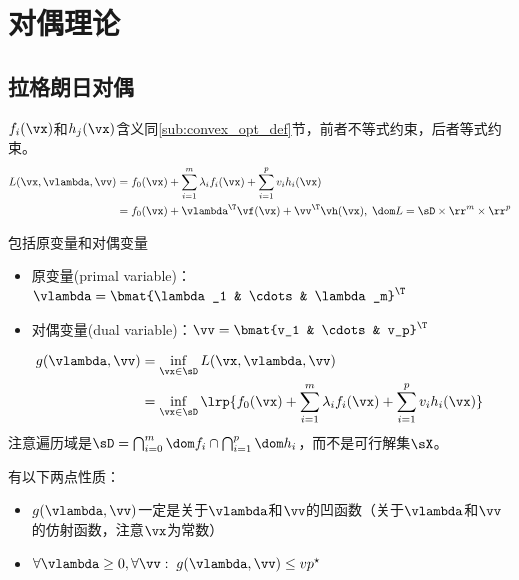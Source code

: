 
\section{对偶理论}
\subsection{拉格朗日对偶}
\begin{definition}
$f_i(\vx)$和$h_j(\vx)$含义同\ref{sub:convex_opt_def}节，前者不等式约束，后者等式约束。
\[\begin{aligned}
    L(\vx,\vlambda,\vv)&=f_0(\vx)+\sum_{i=1}^m\lambda_if_i(\vx)+\sum_{i=1}^pv_ih_i(\vx)\\
    &=f_0(\vx) + \vlambda^\T \vf(\vx)+\vv^\T \vh(\vx),\;\dom L=\sD\times \rr^m\times \rr^p
\end{aligned}\]
\end{definition}

\begin{definition}
    包括原变量和对偶变量
\begin{itemize}
\item 原变量(primal variable)：$\vlambda=\bmat{\lambda_1 & \cdots & \lambda_m}^\T$
\item 对偶变量(dual variable)：$\vv=\bmat{v_1 & \cdots & v_p}^\T$
\end{itemize}
\end{definition}

\begin{definition}[拉格朗日对偶函数]
\[\begin{aligned}
    g(\vlambda,\vv)&=\inf_{\vx\in\sD} L(\vx,\vlambda,\vv)\\
    &=\inf_{\vx\in\sD}\lrp{f_0(\vx)+\sum_{i=1}^m\lambda_if_i(\vx)+\sum_{i=1}^pv_ih_i(\vx)}
\end{aligned}\]
注意遍历域是$\sD=\bigcap_{i=0}^m\dom f_i\cap\bigcap_{i=1}^p\dom h_i$，而不是可行解集$\sX$。
\end{definition}

有以下两点性质：
\begin{itemize}
    \item $g(\vlambda,\vv)$一定是关于$\vlambda$和$\vv$的凹函数（关于$\vlambda$和$\vv$的仿射函数，注意$\vx$为常数）
    \item $\forall\vlambda\geq 0,\forall \vv:\;g(\vlambda,\vv)\leq vp^\star$
\end{itemize}

